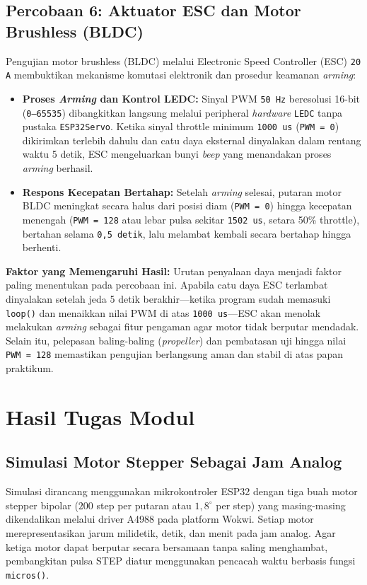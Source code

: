 \subsection{Percobaan 6: Aktuator ESC dan Motor Brushless (BLDC)}
Pengujian motor brushless (BLDC) melalui Electronic Speed Controller (ESC) \texttt{20 A} membuktikan mekanisme komutasi elektronik dan prosedur keamanan \textit{arming}:
\begin{itemize}
    \item \textbf{Proses \textit{Arming} dan Kontrol LEDC:} Sinyal PWM \texttt{50 Hz} beresolusi 16-bit (\texttt{0--65535}) dibangkitkan langsung melalui peripheral \textit{hardware} \texttt{LEDC} tanpa pustaka \texttt{ESP32Servo}. Ketika sinyal throttle minimum \texttt{1000 us} (\texttt{PWM = 0}) dikirimkan terlebih dahulu dan catu daya eksternal dinyalakan dalam rentang waktu 5 detik, ESC mengeluarkan bunyi \textit{beep} yang menandakan proses \textit{arming} berhasil.
    \item \textbf{Respons Kecepatan Bertahap:} Setelah \textit{arming} selesai, putaran motor BLDC meningkat secara halus dari posisi diam (\texttt{PWM = 0}) hingga kecepatan menengah (\texttt{PWM = 128} atau lebar pulsa sekitar \texttt{1502 us}, setara 50\% throttle), bertahan selama \texttt{0,5 detik}, lalu melambat kembali secara bertahap hingga berhenti.
\end{itemize}

\textbf{Faktor yang Memengaruhi Hasil:} Urutan penyalaan daya menjadi faktor paling menentukan pada percobaan ini. Apabila catu daya ESC terlambat dinyalakan setelah jeda 5 detik berakhir—ketika program sudah memasuki \texttt{loop()} dan menaikkan nilai PWM di atas \texttt{1000 us}—ESC akan menolak melakukan \textit{arming} sebagai fitur pengaman agar motor tidak berputar mendadak. Selain itu, pelepasan baling-baling (\textit{propeller}) dan pembatasan uji hingga nilai \texttt{PWM = 128} memastikan pengujian berlangsung aman dan stabil di atas papan praktikum.

\section{Hasil Tugas Modul}

\subsection{Simulasi Motor Stepper Sebagai Jam Analog}
Simulasi dirancang menggunakan mikrokontroler ESP32 dengan tiga buah motor stepper bipolar ($200$ step per putaran atau $1,8^\circ$ per step) yang masing-masing dikendalikan melalui driver A4988 pada platform Wokwi. Setiap motor merepresentasikan jarum milidetik, detik, dan menit pada jam analog. Agar ketiga motor dapat berputar secara bersamaan tanpa saling menghambat, pembangkitan pulsa STEP diatur menggunakan pencacah waktu berbasis fungsi \texttt{micros()}.

